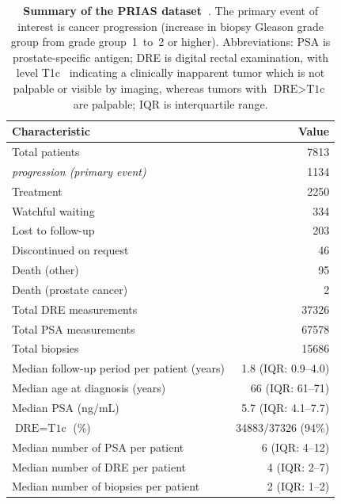 \begin{table}
\small
\centering
\caption{\textbf{Summary of the PRIAS dataset~\citep{tomer2020webapp}}. The primary event of interest is cancer progression (increase in biopsy Gleason grade group from grade group~1~to~2 or higher). Abbreviations: PSA is prostate-specific antigen; DRE is digital rectal examination, with level T1c~\citep{schroder1992tnm} indicating a clinically inapparent tumor which is not palpable or visible by imaging, whereas tumors with $\mbox{DRE} > \mbox{T1c}$ are palpable; IQR is interquartile range.}
\label{table:prias_summary}
\begin{tabular}{lr}
\hline
\hline
\textbf{Characteristic} &  \textbf{Value}\\
\hline
Total patients &  7813\\
\textit{progression (primary event)}  & 1134\\
Treatment  &  2250\\
Watchful waiting   & 334\\
Lost to follow-up   & 203\\
Discontinued on request   & 46\\
Death (other)   & 95\\
Death (prostate cancer)   & 2\\
\hline
Total DRE measurements & 37326 \\
Total PSA measurements  & 67578\\
Total biopsies & 15686\\
\hline
Median follow-up period per patient (years)   &  1.8 (IQR: 0.9--4.0)\\
Median age at diagnosis (years)   & 66 (IQR: 61--71)\\
Median PSA (ng/mL) & 5.7 (IQR: 4.1--7.7)\\
$\mbox{DRE} = \mbox{T1c}$ (\%)  & 34883/37326 (94\%) \\
\hline
Median number of PSA per patient   &  6 (IQR: 4--12)\\
Median number of DRE per patient & 4 (IQR: 2--7)\\
Median number of biopsies per patient  &  2 (IQR: 1--2)\\
\hline
\end{tabular}
\end{table}
 
